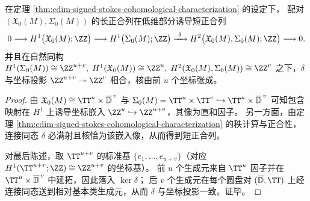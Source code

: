 \begin{proposition}\label{prop:cdim-stokes-exact-sequence-dictionary}
在定理 \ref{thm:cdim-signed-stokes-cohomological-characterization} 的设定下，
配对 \((\mathfrak X_0(M),\Sigma_0(M))\) 的长正合列在低维部分诱导短正合列
\[
0\longrightarrow H^{1}\bigl(\mathfrak X_0(M);\ZZ\bigr)
\longrightarrow H^{1}\bigl(\Sigma_0(M);\ZZ\bigr)
\xrightarrow{\ \delta\ }
H^{2}\bigl(\mathfrak X_0(M),\Sigma_0(M);\ZZ\bigr)
\longrightarrow 0.
\]
并且在自然同构
\(
H^{1}(\Sigma_0(M))\cong \ZZ^{u+v},\;
H^{1}(\mathfrak X_0(M))\cong \ZZ^{u},\;
H^{2}(\mathfrak X_0(M),\Sigma_0(M))\cong \ZZ^{v}
\)
之下，\(\delta\) 与坐标投影 \(\ZZ^{u+v}\twoheadrightarrow \ZZ^{v}\) 相合，核由前 \(u\) 个坐标张成。
\end{proposition}
\begin{proof}
由
\(
\mathfrak X_0(M)\cong \TT^{u}\times \overline{\mathbb D}^{\,v}
\)
与
\(
\Sigma_0(M)=\TT^{u}\times \TT^{v}\hookrightarrow \TT^{u}\times \overline{\mathbb D}^{\,v}
\)
可知包含映射在 \(H^{1}\) 上诱导坐标嵌入 \(\ZZ^{u}\hookrightarrow \ZZ^{u+v}\)，其像为直和因子。
另一方面，由定理 \ref{thm:cdim-signed-stokes-cohomological-characterization} 的秩计算与正合性，连接同态 \(\delta\) 必满射且核恰为该嵌入像，从而得到短正合列。
\par
对最后陈述，取 \(\TT^{u+v}\) 的标准基 \(\{e_1,\dots,e_{u+v}\}\)（对应 \(H^{1}(\TT^{u+v};\ZZ)\cong \ZZ^{u+v}\) 的坐标基）。
前 \(u\) 个生成元来自 \(\TT^{u}\) 因子并在 \(\TT^{u}\times \overline{\mathbb D}^{\,v}\) 中延拓，因此落入 \(\ker\delta\)；
后 \(v\) 个生成元在每个圆盘对 \((\overline{\mathbb D},\TT)\) 上经连接同态送到相对基本类生成元，从而 \(\delta\) 与坐标投影一致。证毕。
\end{proof}







